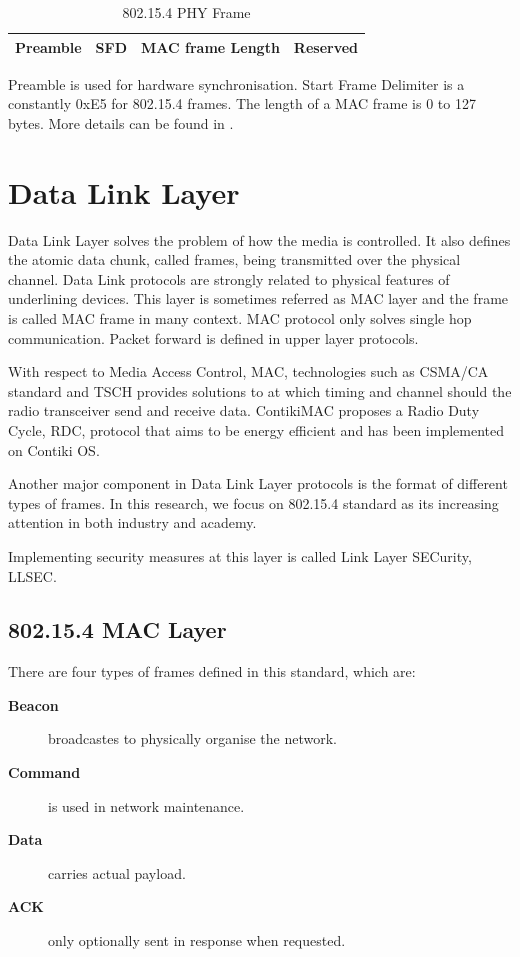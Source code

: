 \begin{table}[h!]
	\centering
	\begin{tabular}{|l|l|l|l|}
		\hline
		Preamble & SFD & MAC frame Length & Reserved \\ \hline
	\end{tabular}
	\caption{802.15.4 PHY Frame}
	\label{Fig: 802.15.4 PHY Frame}
\end{table}

Preamble is used for hardware synchronisation. Start Frame Delimiter is a constantly 0xE5 for 802.15.4 frames. The length of a MAC frame is 0 to 127 bytes. More details can be found in \cite{802154}.

\section{Data Link Layer} \label{Sec: Data Link Layer}
Data Link Layer solves the problem of how the media is controlled. It also defines the atomic data chunk, called frames, being transmitted over the physical channel. Data Link protocols are strongly related to physical features of underlining devices. This layer is sometimes referred as MAC layer and the frame is called MAC frame in many context. MAC protocol only solves single hop communication. Packet forward is defined in upper layer protocols.

With respect to Media Access Control, MAC, technologies such as CSMA/CA \cite{802154} standard and TSCH\cite{TSCH} provides solutions to at which timing and channel should the radio transceiver send and receive data. ContikiMAC\cite{ContikiMAC} proposes a Radio Duty Cycle, RDC, protocol that aims to be energy efficient and has been implemented on Contiki OS.

Another major component in Data Link Layer protocols is the format of different types of frames. In this research, we focus on 802.15.4 standard as its increasing attention in both industry and academy. 

Implementing security measures at this layer is called Link Layer SECurity, LLSEC. 

\subsection{802.15.4 MAC Layer} \label{Subsec: 802.15.4 MAC Layer}

There are four types of frames defined in this standard, which are:
\begin{description}
	\item[\textbf{Beacon}] broadcastes to physically organise the network.
	\item[\textbf{Command}] is used in network maintenance.
	\item[\textbf{Data}] carries actual payload.
	\item[\textbf{ACK}] only optionally sent in response when requested.
\end{description}

